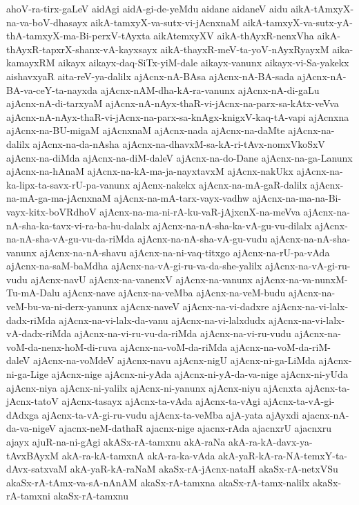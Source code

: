 {ahoV-ra-tirx-gaLeV
aidAgi
aidA-gi-de-yeMdu
aidane
aidaneV
aidu
aikA-tAmxyX-na-va-boV-dhasayx
aikA-tamxyX-va-sutx-vi-jAcnxnaM
aikA-tamxyX-va-sutx-yA-thA-tamxyX-ma-Bi-perxV-tAyxta
aikAtemxyXV
aikA-thAyxR-nenxVha
aikA-thAyxR-tapxrX-shanx-vA-kayxsayx
aikA-thayxR-meV-ta-yoV-nAyxRyayxM
aika-kamayxRM
aikayx
aikayx-daq-SiTx-yiM-dale
aikayx-vanunx
aikayx-vi-Sa-yakekx
aishavxyaR
aita-reV-ya-dalilx
ajAcnx-nA-BAsa
ajAcnx-nA-BA-sada
ajAcnx-nA-BA-va-ceY-ta-nayxda
ajAcnx-nAM-dha-kA-ra-vanunx
ajAcnx-nA-di-gaLu
ajAcnx-nA-di-tarxyaM
ajAcnx-nA-nAyx-thaR-vi-jAcnx-na-parx-sa-kAtx-veVva
ajAcnx-nA-nAyx-thaR-vi-jAcnx-na-parx-sa-knAgx-knigxV-kaq-tA-vapi
ajAcnxna
ajAcnx-na-BU-migaM
ajAcnxnaM
ajAcnx-nada
ajAcnx-na-daMte
ajAcnx-na-dalilx
ajAcnx-na-da-nAsha
ajAcnx-na-dhavxM-sa-kA-ri-tAvx-nomxVkoSxV
ajAcnx-na-diMda
ajAcnx-na-diM-daleV
ajAcnx-na-do-Dane
ajAcnx-na-ga-Lanunx
ajAcnx-na-hAnaM
ajAcnx-na-kA-ma-ja-nayxtavxM
ajAcnx-nakUkx
ajAcnx-na-ka-lipx-ta-savx-rU-pa-vanunx
ajAcnx-nakekx
ajAcnx-na-mA-gaR-dalilx
ajAcnx-na-mA-ga-ma-jAcnxnaM
ajAcnx-na-mA-tarx-vayx-vadhw
ajAcnx-na-ma-na-Bi-vayx-kitx-boVRdhoV
ajAcnx-na-ma-ni-rA-ku-vaR-jAjxcnX-na-meVva
ajAcnx-na-nA-sha-ka-tavx-vi-ra-ba-hu-dalalx
ajAcnx-na-nA-sha-ka-vA-gu-vu-dilalx
ajAcnx-na-nA-sha-vA-gu-vu-da-riMda
ajAcnx-na-nA-sha-vA-gu-vudu
ajAcnx-na-nA-sha-vanunx
ajAcnx-na-nA-shavu
ajAcnx-na-ni-vaq-titxgo
ajAcnx-na-rU-pa-vAda
ajAcnx-na-saM-baMdha
ajAcnx-na-vA-gi-ru-va-da-she-yalilx
ajAcnx-na-vA-gi-ru-vudu
ajAcnx-navU
ajAcnx-na-vanenxV
ajAcnx-na-vanunx
ajAcnx-na-va-nunxM-Tu-mA-Dalu
ajAcnx-nave
ajAcnx-na-veMba
ajAcnx-na-veM-budu
ajAcnx-na-veM-bu-va-ni-derx-yanunx
ajAcnx-naveV
ajAcnx-na-vi-dadxre
ajAcnx-na-vi-lalx-dadx-riMda
ajAcnx-na-vi-lalx-da-vanu
ajAcnx-na-vi-lalxdudx
ajAcnx-na-vi-lalx-vA-dadx-riMda
ajAcnx-na-vi-ru-vu-da-riMda
ajAcnx-na-vi-ru-vudu
ajAcnx-na-voM-da-nenx-hoM-di-ruva
ajAcnx-na-voM-da-riMda
ajAcnx-na-voM-da-riM-daleV
ajAcnx-na-voMdeV
ajAcnx-navu
ajAcnx-nigU
ajAcnx-ni-ga-LiMda
ajAcnx-ni-ga-Lige
ajAcnx-nige
ajAcnx-ni-yAda
ajAcnx-ni-yA-da-va-nige
ajAcnx-ni-yUda
ajAcnx-niya
ajAcnx-ni-yalilx
ajAcnx-ni-yanunx
ajAcnx-niyu
ajAcnxta
ajAcnx-ta-jAcnx-tatoV
ajAcnx-tasayx
ajAcnx-ta-vAda
ajAcnx-ta-vAgi
ajAcnx-ta-vA-gi-dAdxga
ajAcnx-ta-vA-gi-ru-vudu
ajAcnx-ta-veMba
ajA-yata
ajAyxdi
ajacnx-nA-da-va-nigeV
ajacnx-neM-dathaR
ajacnx-nige
ajacnx-rAda
ajacnxrU
ajacnxru
ajayx
ajuR-na-ni-gAgi
akASx-rA-tamxnu
akA-raNa
akA-ra-kA-davx-ya-tAvxBAyxM
akA-ra-kA-tamxnA
akA-ra-ka-vAda
akA-yaR-kA-ra-NA-temxY-ta-dAvx-satxvaM
akA-yaR-kA-raNaM
akaSx-rA-jAcnx-nataH
akaSx-rA-netxVSu
akaSx-rA-tAmx-va-sA-nAnAM
akaSx-rA-tamxna
akaSx-rA-tamx-nalilx
akaSx-rA-tamxni
akaSx-rA-tamxnu
}
